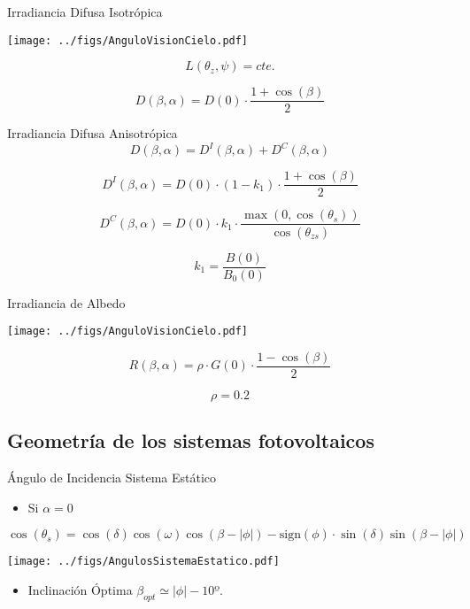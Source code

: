 \documentclass[xcolor={usenames,svgnames,dvipsnames}]{beamer}
\begin{document}
\begin{frame}[label={sec:org09de5d3}]{Irradiancia Difusa Isotrópica}
\begin{center}
\texttt{[image: ../figs/AnguloVisionCielo.pdf]}
\end{center}


\[L(\theta_{z},\psi)=cte.\]

\[D(\beta,\alpha)=D(0)\cdot\frac{1+\cos(\beta)}{2}\]
\end{frame}
\begin{frame}[label={sec:orgc719659}]{Irradiancia Difusa Anisotrópica}
\[D(\beta,\alpha) = D^{I}(\beta,\alpha)+D^{C}(\beta,\alpha)\]

\[D^{I}(\beta,\alpha) = D(0) \cdot (1-k_{1}) \cdot \frac{1 + \cos(\beta)}{2}\]

\[D^{C}(\beta,\alpha) = D(0) \cdot k_{1} \cdot \frac{\max(0,\cos(\theta_{s}))}{\cos(\theta_{zs})}\]

\[k_{1} = \frac{B(0)}{B_{0}(0)}\]
\end{frame}

\begin{frame}[label={sec:orgb2619e4}]{Irradiancia de Albedo}
\begin{center}
\texttt{[image: ../figs/AnguloVisionCielo.pdf]}
\end{center}


\[R(\beta,\alpha)=\rho\cdot G(0)\cdot\frac{1-\cos(\beta)}{2}\]

\[\rho=0.2\]
\end{frame}

\subsection{Geometría de los sistemas fotovoltaicos}
\label{sec:org67790b9}
\begin{frame}[label={sec:org807074e},plain]{Ángulo de Incidencia Sistema Estático}
\begin{itemize}
\item Si \(\alpha=0\)
\end{itemize}
\[
\cos(\theta_{s}) = \cos(\delta)\cos(\omega)\cos(\beta-|\phi|)- \mathrm{sign}(\phi)\cdot\sin(\delta)\sin(\beta-|\phi|)
\]

\begin{center}
\texttt{[image: ../figs/AngulosSistemaEstatico.pdf]}
\end{center}

\begin{itemize}
\item Inclinación Óptima \(\beta_{opt} \simeq |\phi| - 10º\).
\end{itemize}
\end{frame}
\end{document}
